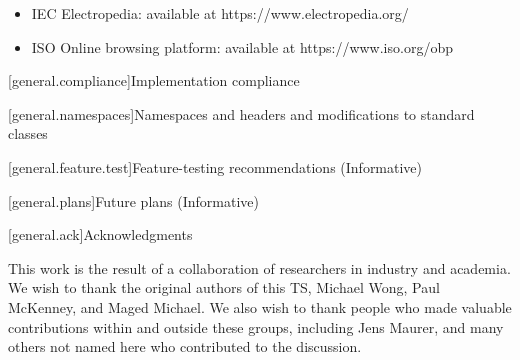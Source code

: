 \begin{itemize}
    \item IEC Electropedia: available at https://www.electropedia.org/
    \item ISO Online browsing platform: available at https://www.iso.org/obp
\end{itemize}

[general.compliance]{Implementation compliance}

[general.namespaces]{Namespaces and headers and modifications to standard classes}

[general.feature.test]{Feature-testing recommendations (Informative)}

[general.plans]{Future plans (Informative)}

[general.ack]{Acknowledgments}

This work is the result of a collaboration of researchers in industry and academia. We wish to thank the
original authors of this TS, Michael Wong, Paul McKenney, and Maged Michael. We also wish to thank people
who made valuable contributions within and outside these groups, including Jens Maurer, and many others not named
here who contributed to the discussion.




